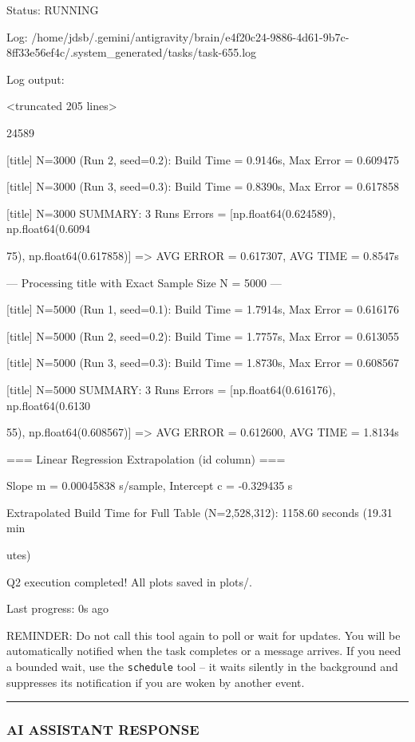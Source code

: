 \documentclass[11pt,a4paper]{article}
\begin{document}
Status: RUNNING

Log: /home/jdsb/.gemini/antigravity/brain/e4f20c24-9886-4d61-9b7c-8ff33e56ef4c/.system\_generated/tasks/task-655.log

Log output:

<truncated 205 lines>

24589

[title] N=3000 (Run 2, seed=0.2): Build Time = 0.9146s, Max Error = 0.609475

[title] N=3000 (Run 3, seed=0.3): Build Time = 0.8390s, Max Error = 0.617858

[title] N=3000 SUMMARY: 3 Runs Errors = [np.float64(0.624589), np.float64(0.6094

75), np.float64(0.617858)] => AVG ERROR = 0.617307, AVG TIME = 0.8547s

--- Processing title with Exact Sample Size N = 5000 ---

[title] N=5000 (Run 1, seed=0.1): Build Time = 1.7914s, Max Error = 0.616176

[title] N=5000 (Run 2, seed=0.2): Build Time = 1.7757s, Max Error = 0.613055

[title] N=5000 (Run 3, seed=0.3): Build Time = 1.8730s, Max Error = 0.608567

[title] N=5000 SUMMARY: 3 Runs Errors = [np.float64(0.616176), np.float64(0.6130

55), np.float64(0.608567)] => AVG ERROR = 0.612600, AVG TIME = 1.8134s


=== Linear Regression Extrapolation (id column) ===

Slope m = 0.00045838 s/sample, Intercept c = -0.329435 s

Extrapolated Build Time for Full Table (N=2,528,312): 1158.60 seconds (19.31 min

utes)

Q2 execution completed! All plots saved in plots/.


Last progress: 0s ago



REMINDER: Do not call this tool again to poll or wait for updates. You will be automatically notified when the task completes or a message arrives. If you need a bounded wait, use the \texttt{schedule} tool -- it waits silently in the background and suppresses its notification if you are woken by another event.


\hrule

\subsubsection{AI ASSISTANT RESPONSE}
\end{document}
